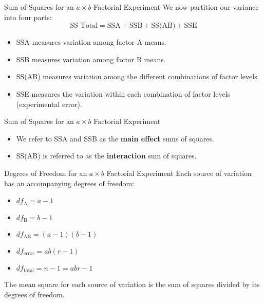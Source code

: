 \begin{frame}{Sum of Squares for an $a\times b$ Factorial Experiment}
    We now partition our variance into four parts:
    \[
        \text{SS Total}=\text{SSA} + \text{SSB} + \text{SS(AB)} + \text{SSE}
    \]
    \begin{itemize}
        \item SSA measures variation among factor A means.
        \item SSB measures variation among factor B means.
        \item SS(AB) measures variation among the different combinations of factor levels.
        \item SSE measures the variation within each combination of factor levels (experimental error).
    \end{itemize}
\end{frame}

\begin{frame}{Sum of Squares for an $a\times b$ Factorial Experiment}
    \begin{itemize}
        \item We refer to SSA and SSB as the \textbf{main effect} sums of squares.
        \item SS(AB) is referred to as the \textbf{interaction} sum of squares.
    \end{itemize}
\end{frame}

\begin{frame}{Degrees of Freedom for an $a\times b$ Factorial Experiment}
    Each source of variation has an accompanying degrees of freedom:
    \begin{itemize}
        \item $df_{\text{A}} = a-1$
        \item $df_{\text{B}} = b-1$
        \item $df_{\text{AB}} = (a-1)(b-1)$
        \item $df_{\text{error}} = ab(r-1)$
        \item $df_{\text{total}} = n-1 = abr-1$
    \end{itemize}
    The mean square for each source of variation is the sum of squares divided by its degrees of freedom.
\end{frame}

